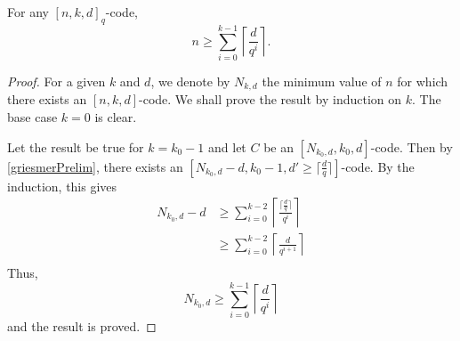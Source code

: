 \begin{theorem}
    For any $[n,k,d]_q$-code,
    $$n\geq\sum_{i=0}^{k-1}\left\lceil\frac{d}{q^i}\right\rceil.$$
\end{theorem}
\begin{proof}
    For a given $k$ and $d$, we denote by $N_{k,d}$ the minimum value of $n$ for which there exists an $[n,k,d]$-code. We shall prove the result by induction on $k$. The base case $k=0$ is clear.
    
    Let the result be true for $k=k_0-1$ and let $C$ be an $[N_{k_0,d},k_0,d]$-code. Then by \ref{griesmerPrelim}, there exists an $[N_{k_0,d}-d, k_0-1, d'\geq \lceil\frac{d}{q}\rceil]$-code. By the induction, this gives
    \begin{align*}
        N_{k_0,d}-d &\geq \sum_{i=0}^{k-2}\left\lceil\frac{\lceil\frac{d}{q}\rceil}{q^i}\right\rceil \\
                    &\geq \sum_{i=0}^{k-2}\left\lceil\frac{d}{q^{i+1}}\right\rceil \\
    \end{align*}
    Thus,
    $$N_{k_0,d}\geq \sum_{i=0}^{k-1}\left\lceil\frac{d}{q^i}\right\rceil$$
    and the result is proved.
\end{proof}

\clearpage